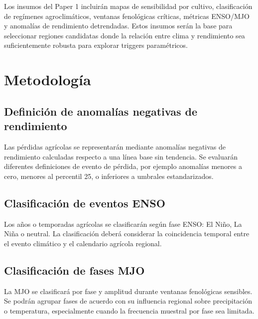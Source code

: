 Los insumos del Paper 1 incluirán mapas de sensibilidad por cultivo, clasificación de regímenes agroclimáticos, ventanas fenológicas críticas, métricas ENSO/MJO y anomalías de rendimiento detrendadas. Estos insumos serán la base para seleccionar regiones candidatas donde la relación entre clima y rendimiento sea suficientemente robusta para explorar triggers paramétricos.


\section{Metodología}

\subsection{Definición de anomalías negativas de rendimiento}

Las pérdidas agrícolas se representarán mediante anomalías negativas de rendimiento calculadas respecto a una línea base sin tendencia. Se evaluarán diferentes definiciones de evento de pérdida, por ejemplo anomalías menores a cero, menores al percentil 25, o inferiores a umbrales estandarizados.


\subsection{Clasificación de eventos ENSO}

Los años o temporadas agrícolas se clasificarán según fase ENSO: El Niño, La Niña o neutral. La clasificación deberá considerar la coincidencia temporal entre el evento climático y el calendario agrícola regional.


\subsection{Clasificación de fases MJO}

La MJO se clasificará por fase y amplitud durante ventanas fenológicas sensibles. Se podrán agrupar fases de acuerdo con su influencia regional sobre precipitación o temperatura, especialmente cuando la frecuencia muestral por fase sea limitada.

